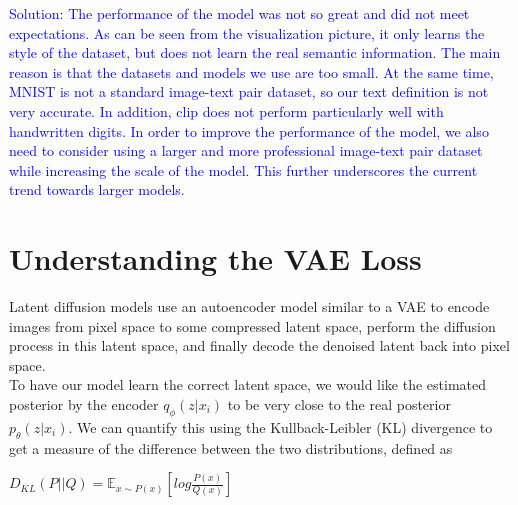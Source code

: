 \documentclass[a4paper]{article}
\begin{document}
\begin{itemize}
    \textcolor{blue}{Solution: The performance of the model was not so great and did not meet expectations. As can be seen from the visualization picture, it only learns the style of the dataset, but does not learn the real semantic information. The main reason is that the datasets and models we use are too small. At the same time, MNIST is not a standard image-text pair dataset, so our text definition is not very accurate. In addition, clip does not perform particularly well with handwritten digits. In order to improve the performance of the model, we also need to consider using a larger and more professional image-text pair dataset while increasing the scale of the model. This further underscores the current trend towards larger models.}
\end{itemize}

\section{Understanding the VAE Loss}

Latent diffusion models use an autoencoder model similar to a VAE to encode images from pixel space to some compressed latent space, perform the diffusion process in this latent space, and finally decode the denoised latent back into pixel space. \\

To have our model learn the correct latent space, we would like the estimated posterior by the encoder \(q_{\phi}(z|x_{i})\) to be very close to the real posterior \(p_{\theta}(z|x_i)\). We can quantify this using the Kullback-Leibler (KL) divergence to get a measure of the difference between the two distributions, defined as 
\begin{center}
\(D_{KL}(P||Q) = \mathbb{E}_{x\sim P(x)}[log \frac{P(x)}{Q(x)}]\)
\end{center}
\end{document}

